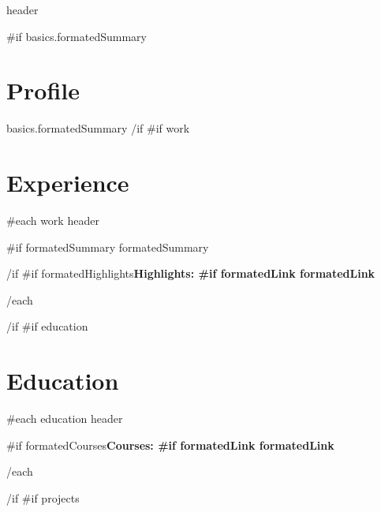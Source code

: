\documentclass{article}
{{ markdownPackage }}
\begin{document}
\begin{paracol}{2}
\begin{rightcolumn}
\titleformat{\section}{\color{accent}\raggedright\normalsize\bfseries\uppercase}{}{0ex}{}[{\titlerule[0.8pt]}]
\titlespacing{\section}{0ex}{0.5ex}{0.75ex}

{{ header }}

{{#if basics.formatedSummary}}
\section*{Profile} {
  {{ basics.formatedSummary }}
}
{{/if}}
{{#if work}}
\section*{Experience} {
  {{#each work}}
    {{ header }}\par
    {{#if formatedSummary}}
      {{ formatedSummary }}
      \par
    {{/if}}
    {{#if formatedHighlights}}\bfseries Highlights: 
    {{#if formatedLink}}{{ formatedLink }}
    \par
  {{/each}}
}
{{/if}}
{{#if education}}
\section*{Education} {
  {{#each education}}
    {{ header }}\par
    {{#if formatedCourses}}\bfseries Courses: 
    {{#if formatedLink}}{{ formatedLink }}
    \par
  {{/each}}
}
{{/if}}
{{#if projects}}

\end{rightcolumn}
\end{paracol}
\end{document}
